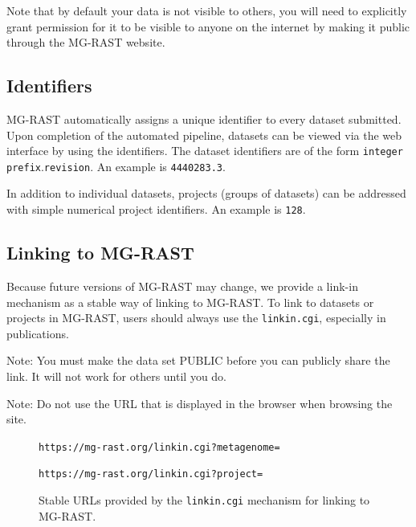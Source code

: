 \documentclass[12pt,fullpage]{report}
\begin{document}
\noindent
Note that by default your data is not visible to others, you will need to explicitly grant permission for it to be visible to anyone on the internet by making it public through the MG-RAST website.

\subsection*{Identifiers}
\label{section:identifier}
MG-RAST automatically assigns a unique identifier to every dataset submitted. Upon completion of the automated pipeline, datasets can be viewed via the web interface by using the identifiers.
The dataset identifiers are of the form \texttt{integer prefix}.\texttt{revision}.
An example is \texttt{4440283.3}.

In addition to individual datasets, projects (groups of datasets) can be addressed with simple numerical project identifiers.
An example is \texttt{128}.
\subsection*{Linking to MG-RAST}
\label{section:linkin}
Because future versions of MG-RAST may change, we provide a link-in mechanism as a stable way of linking to MG-RAST. To link to datasets or projects in MG-RAST, users should always use the \texttt{linkin.cgi}, especially in publications.

Note: You must make the data set PUBLIC before you can publicly share the link. It will not work for others until you do.

Note: Do not use the URL that is displayed in the browser when browsing the site.

\begin{figure}[ht]

\texttt{https://mg-rast.org/linkin.cgi?metagenome=}

\texttt{https://mg-rast.org/linkin.cgi?project=}

\caption{Stable URLs provided by the \texttt{linkin.cgi} mechanism for linking to MG-RAST.}
\label{fig:linkin.cgi}

\end{figure}
\end{document}
